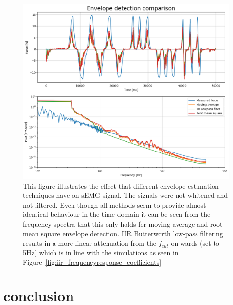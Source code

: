 \begin{figure}[h!t]
	\begin{center}
		\includegraphics[width=1.0\columnwidth]{images/measurement_envelopes.png}
	\end{center}
	\caption{This figure illustrates the effect that different envelope estimation techniques have on sEMG signal. The signals were not whitened and not filtered. Even though all methods seem to provide almost identical behaviour in the time domain it can be seen from the frequency spectra that this only holds for moving average and root mean square envelope detection. IIR Butterworth low-pass filtering results in a more linear attenuation from the $f_{cut}$ on wards (set to 5Hz) which is in line with the simulations as seen in Figure~\ref{fig:iir_frequencyresponse_coefficients}}
	\label{fig:result_envelopes}
\end{figure}

\section{conclusion}